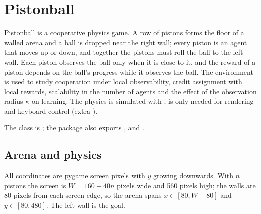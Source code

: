 \begingroup
\setlength{\emergencystretch}{3em}
\chapter{Pistonball}\label{chap:pistonball}

Pistonball is a cooperative physics game. A row of pistons forms the floor of a
walled arena and a ball is dropped near the right wall; every piston is an
agent that moves up or down, and together the pistons must roll the ball to
the left wall. Each piston observes the ball only when it is close to it, and
the reward of a piston depends on the ball's progress while it observes the
ball. The environment is used to study cooperation under local observability,
credit assignment with local rewards, scalability in the number of agents and
the effect of the observation radius $\kappa$ on learning. The physics is
simulated with ;  is only needed for rendering and
keyboard control (extra ).

The class is ; the package also
exports ,  and
.

\section{Arena and physics}\label{sec:pistonball-physics}

All coordinates are pygame screen pixels with $y$ growing downwards. With $n$
pistons the screen is $W = 160 + 40n$ pixels wide and 560 pixels high; the
walls are 80 pixels from each screen edge, so the arena spans
$x \in [80, W - 80]$ and $y \in [80, 480]$. The left wall is the goal.

